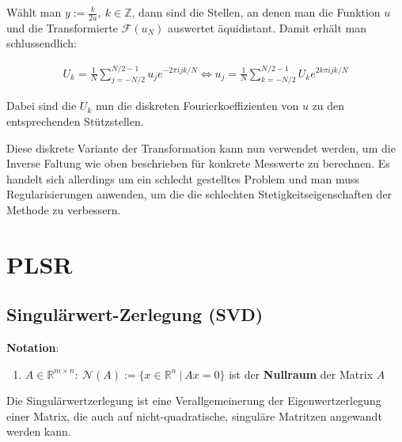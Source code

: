 \documentclass{article}
\newcommand{\R}[0]{\mathbb{R}}
\begin{document}
Wählt man $y := \frac{k}{2a}, \: k \in \mathbb{Z}$, dann sind die Stellen, an denen man die Funktion $u$ und die Transformierte $\mathcal{F}(u_N)$
auswertet äquidistant. Damit erhält man schlussendlich:

\begin{align}
    U_k = \frac{1}{N} \sum\limits_{j=-N/2}^{N/2-1} u_j e^{-2\pi ijk/N}
\iff u_j = \frac{1}{N} \sum\limits_{k=-N/2}^{N/2-1} U_k e^{2k\pi ijk/N}
\end{align}

Dabei sind die $U_k$ nun die diskreten Fourierkoeffizienten von $u$ zu den entsprechenden Stützstellen.

Diese diskrete Variante der Transformation kann nun verwendet werden, um die Inverse Faltung wie oben beschrieben für konkrete Messwerte zu berechnen. 
Es handelt sich allerdings um ein schlecht gestelltes Problem und man muss Regularisierungen anwenden, um die die schlechten Stetigkeitseigenschaften der Methode zu verbessern. 

\section{PLSR}

\subsection{Singulärwert-Zerlegung (SVD)}
\textbf{Notation}:
\begin{enumerate}
    \item $A \in \R^{m \times n}: \: \mathcal{N}(A) := \{x \in \R^n \: | \: Ax = 0\}$ ist der \textbf{Nullraum} der Matrix $A$
\end{enumerate}

Die Singulärwertzerlegung ist eine Verallgemeinerung der Eigenwertzerlegung einer Matrix, die auch auf nicht-quadratische, singuläre Matritzen angewandt werden kann.
\end{document}
